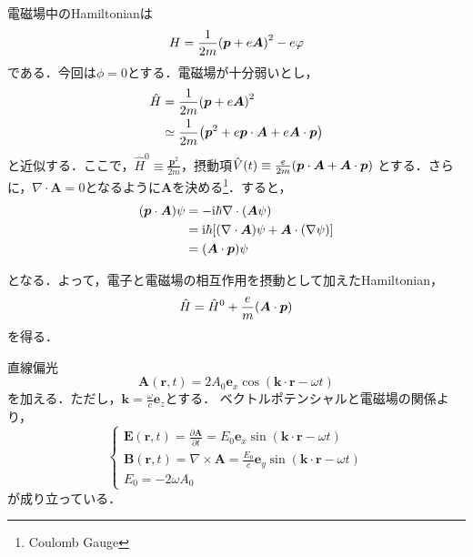 \documentclass{report}
\begin{document}
  電磁場中のHamiltonianは
  \begin{equation}
    H=\frac{1}{2m}\qty(\bm{p} + e\bm{A})^2 - e\varphi
  \end{equation}
  である．今回は$\phi=0$とする．電磁場が十分弱いとし，
  \begin{align}
    \hat{H} &= \frac{1}{2m}\qty(\bm{p}+e\bm{A})^2\\
    &\simeq \frac{1}{2m}\qty(\bm{p}^2+e\bm{p}\cdot\bm{A} + e\bm{A} \cdot \bm{p})\\
  \end{align}
  と近似する．ここで，$\hat{H}^0 \equiv \frac{\bm{p}^2}{2m}$，摂動項$\hat{V}(t) \equiv \frac{e}{2m} \qty(\bm{p}\cdot\bm{A} + \bm{A} \cdot \bm{p})$
  とする．さらに，$\nabla\cdot\bm{A}=0$となるように$\bm{A}$を決める\footnote{Coulomb Gauge}．すると，
  \begin{align}
    \qty(\bm{p} \cdot \bm{A})\psi &= -\mathrm{i}\hbar \nabla \cdot \qty(\bm{A} \psi)\\
    &= \mathrm{i}\hbar\qty[\qty(\nabla \cdot \bm{A}) \psi + \bm{A} \cdot \qty(\nabla \psi)]\\
    &= \qty(\bm{A} \cdot \bm{p}) \psi
  \end{align}

  となる．よって，電子と電磁場の相互作用を摂動として加えたHamiltonian，
  \begin{equation}
    \hat{H} = \hat{H}^0 + \frac{e}{m}\qty(\bm{A} \cdot \bm{p})
  \end{equation}
  を得る．
  \begin{myex}{直線偏光}{}
    \begin{equation}
      \bm{A}(\bm{r},t) = 2A_0 \bm{e}_x \cos(\bm{k} \cdot \bm{r} - \omega t)
    \end{equation}
    を加える．ただし，$\bm{k} = \frac{\omega}{c}\bm{e}_z$とする．
    ベクトルポテンシャルと電磁場の関係より，
    \begin{equation}
      \begin{cases}
      \bm{E}(\bm{r},t) = \frac{\partial \bm{A}}{\partial t} = E_0 \bm{e}_x \sin(\bm{k} \cdot \bm{r} - \omega t)\\
      \bm{B}(\bm{r},t) = \nabla \times \bm{A} = \frac{E_0}{c}\bm{e}_y \sin(\bm{k} \cdot \bm{r} - \omega t)\\
      E_0 = -2 \omega A_0
      \end{cases}
    \end{equation}
    が成り立っている．
  \end{myex}
\end{document}
